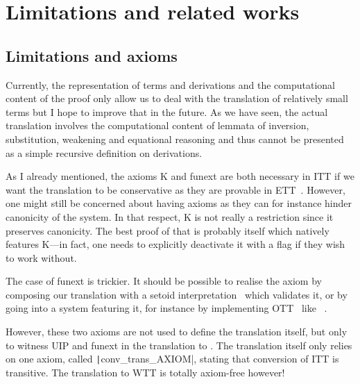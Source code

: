 \chapter{Limitations and related works}

\section{Limitations and axioms}
\label{sec:axioms}

Currently, the representation of terms and derivations and the
computational content of the proof only allow us to deal with the
translation of relatively small terms but I hope to improve that in
the future. As we have seen, the actual translation involves the
computational content of lemmata of inversion, substitution, weakening
and equational reasoning and thus cannot be presented as a simple
recursive definition on derivations.


As I already mentioned, the axioms K and \acrshort{funext} are both
necessary in \acrshort{ITT} if we want the translation to be conservative as
they are provable in \acrshort{ETT}~.
However, one might still be concerned about having axioms
as they can for instance hinder canonicity of the system.
In that respect, K is not really a restriction since it preserves canonicity.
The best proof of that is probably \Agda itself which natively features K---in
fact, one needs to explicitly deactivate it with a flag if they wish to work
without.

The case of \acrshort{funext} is trickier. It should be possible to realise
the axiom by composing our translation with a setoid
interpretation~ which validates it, or by going into a
system featuring it, for instance by implementing
\acrlong{OTT}~ like
\Epigram~.

However, these two axioms are not used to define the translation itself,
but only to witness \acrshort{UIP} and \acrlong{funext} in the translation to
\Coq.
The translation itself only relies on one axiom, called
\texttt|conv_trans_AXIOM|, stating that conversion
of \acrshort{ITT} is transitive.
The translation to \acrshort{WTT} is totally axiom-free however!

